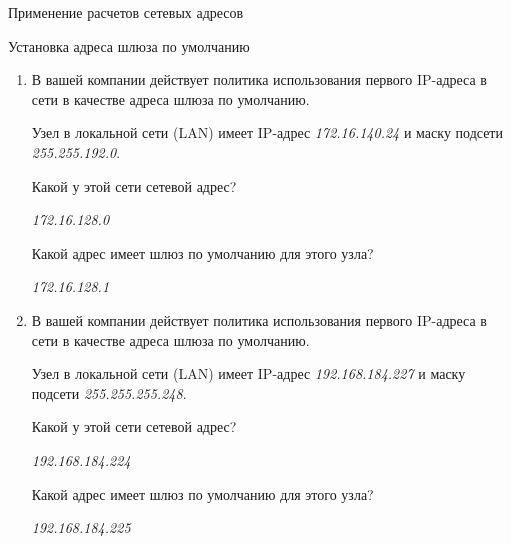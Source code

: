 \documentclass[a4paper,14pt]{extarticle}
\begin{document}
\begin{mypart}{Применение расчетов сетевых адресов}
	\begin{step}{Установка адреса шлюза по умолчанию}
		\begin{enumerate}[label=\alph{enumi}) ]
			\item 
			В вашей компании действует политика использования первого IP-адреса в сети в качестве адреса
			шлюза по умолчанию. 
			
			Узел в локальной сети (LAN) имеет IP-адрес \textit{172.16.140.24} и маску подсети
			\textit{255.255.192.0}.
			
			\q Какой у этой сети сетевой адрес?
			
			\ans \textit{172.16.128.0}
			
			\q Какой адрес имеет шлюз по умолчанию для этого узла?
			
			\ans \textit{172.16.128.1}
			
			\item 
			В вашей компании действует политика использования первого IP-адреса в сети в качестве адреса
			шлюза по умолчанию. 
			
			Узел в локальной сети (LAN) имеет IP-адрес \textit{192.168.184.227} и маску подсети
			\textit{255.255.255.248}.
			
			\q Какой у этой сети сетевой адрес?
			
			\ans \textit{192.168.184.224}
			
			\q Какой адрес имеет шлюз по умолчанию для этого узла?
			
			\ans \textit{192.168.184.225}
		\end{enumerate}
	\end{step}
\end{mypart}
\end{document}
